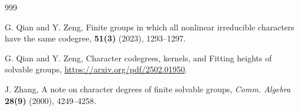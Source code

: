 \documentclass[9pt]{article}
\begin{document}
\begin{thebibliography}{999}
	



	


	G. Qian and Y. Zeng,
	\newblock Finite groups in which all nonlinear irreducible characters have the same codegree,
	 {\bf51(3)} (2023), 1293--1297.
	
	

	G. Qian and Y. Zeng,
	\newblock Character codegrees, kernels, and Fitting heights of solvable groups,
	\href{https://arxiv.org/pdf/2502.01950}{https://arxiv.org/pdf/2502.01950}.

	



	J. Zhang,
	\newblock A note on character degrees of finite solvable groups,
	\newblock \emph{Comm. Algebra} {\bf 28(9)} (2000), 4249--4258.



\end{thebibliography}











 
\end{document}

